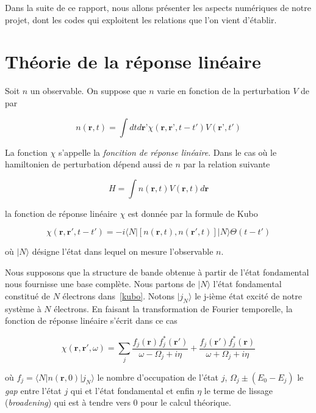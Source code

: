\documentclass[12pt, french]{report}
\theoremstyle{theoreme}
\begin{document}
Dans la suite de ce rapport, nous allons présenter les aspects numériques de notre projet, dont les codes qui exploitent les relations que l'on vient d'établir.



\appendix
\chapter{Théorie de la réponse linéaire}\label{TRL}
Soit $n$ un observable. On suppose que $n$ varie en fonction de la perturbation $V$ de par

$$
n(\textbf{r}, t) = \int dt d\textbf{r'}  \chi (\textbf{r}, \textbf{r'}, t-t') V(\textbf{r'}, t')
$$

La fonction $\chi$ s'appelle la \textit{foncition de réponse linéaire}. Dans le cas où le hamiltonien de perturbation dépend aussi de $n$ par la relation suivante

$$
H = \int n(\textbf{r}, t) V(\textbf{r}, t) d\textbf{r}
$$

la fonction de réponse linéaire $\chi$ est donnée par la formule de Kubo\cite{Ton12}

\begin{equation}\label{kubo}
  \chi (\textbf{r}, \textbf{r}', t-t') = -i \langle N | [n(\textbf{r}, t), n(\textbf{r}', t)] |N \rangle \Theta(t-t')
\end{equation}

où $|N \rangle $ désigne l'état dans lequel on mesure l'observable $n$.

Nous supposons que la structure de bande obtenue à partir de l'état fondamental nous fournisse une base complète. Nous partons de $|N \rangle$ l'état fondamental constitué de $N$ électrons dans~\ref{kubo}. Notons $| j_N \rangle $ le j-ième état excité de notre système à $N$ électrons. En faisant la transformation de Fourier temporelle, la fonction de réponse linéaire s'écrit dans ce cas

\begin{equation}
\chi (\textbf{r}, \textbf{r}', \omega) = \sum_j \frac{f_j(\textbf{r}) f_j^*(\textbf{r}') }{\omega - \Omega_j + i \eta} + \frac{f_j(\textbf{r}') f_j^*(\textbf{r}) }{\omega + \Omega_j + i \eta}
\end{equation}

où $f_j = \langle N | n(\textbf{r}, 0) | j_N \rangle$ le nombre d'occupation de l'état $j$, $\Omega_j \pm (E_0 - E_j)$ le \textit{gap} entre l'état $j$ qui et l'état fondamental et enfin $\eta$ le terme de lissage (\textit{broadening}) qui est à tendre vers 0 pour le calcul théorique.
\end{document}
